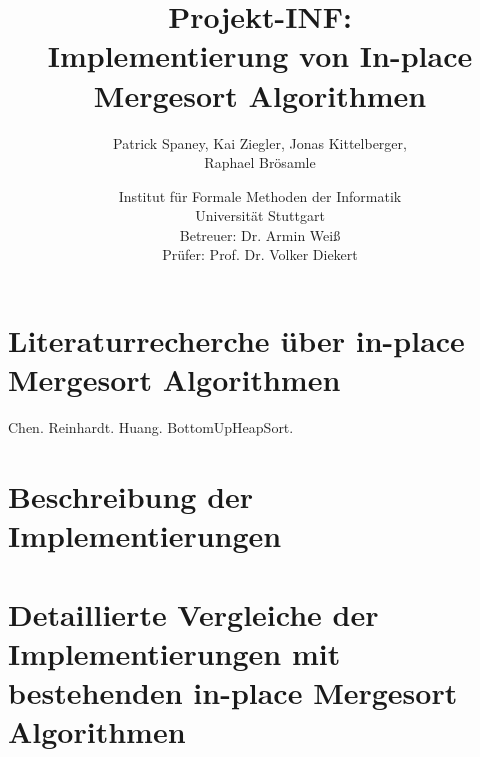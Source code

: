 \documentclass[12pt,pdftex,a4paper, twocolumn]{article}
\begin{document}
\title{Projekt-INF:\\
Implementierung von In-place Mergesort Algorithmen}
\author{Patrick Spaney, Kai Ziegler, Jonas Kittelberger, \\ Raphael Brösamle}
\date{Institut für Formale Methoden der Informatik \\ Universität Stuttgart\\
\normalsize Betreuer: Dr. Armin Weiß\\
Prüfer: Prof. Dr. Volker Diekert}
\maketitle
\section*{Literaturrecherche \"uber in-place Mergesort Algorithmen}

Chen\cite{Chen06}. Reinhardt\cite{Reinhardt92}. Huang\cite{huang1988practical}. BottomUpHeapSort\cite{wegener1993bottom}.

\section*{Beschreibung der Implementierungen}

\section*{Detaillierte Vergleiche der Implementierungen mit bestehenden in-place Mergesort Algorithmen}



\end{document}
